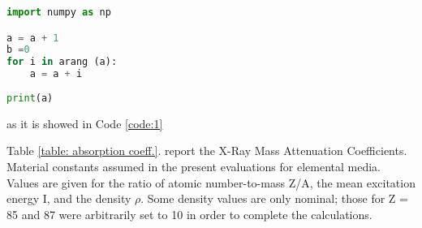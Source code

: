 \begin{lstlisting}[language=Python, caption=pollo, label=code:1]
import numpy as np

a = a + 1
b =0
for i in arang (a):
	a = a + i
	
print(a)
\end{lstlisting}

as it is showed in Code \ref{code:1}

Table \ref{table: absorption coeff.}. report the X-Ray Mass Attenuation Coefficients. Material constants assumed in the present evaluations for elemental media. Values are given for the ratio of atomic number-to-mass Z/A, the mean excitation energy I, and the density $\rho $. Some density values are only nominal; those for Z = 85 and 87 were arbitrarily set to 10 in order to complete the calculations.

